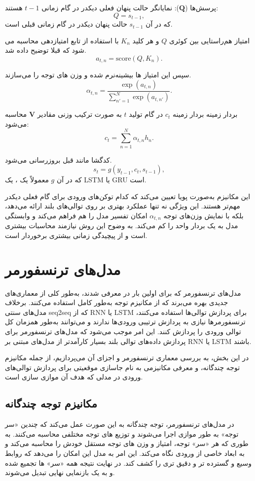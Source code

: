 پرسش‌ها ($\mathbf{Q}$):
نمایانگر حالت پنهان فعلی دیکدر در گام زمانی  $t-1 $ هستند:  
$$
Q = s_{t-1},
$$
که در آن \( s_{t-1} \) حالت پنهان دیکدر در گام زمانی قبلی است.

امتیاز هم‌راستایی بین کوئری $Q$ و هر کلید $ K_n $  با استفاده از تابع امتیازدهی محاسبه می شود که قبلا توضیح داده شد.
$$
a_{t, n} = \text{score}(Q, K_n).
$$

سپس این امتیاز ها بیشینه‌نرم شده و وزن های توجه را می‌سازند.
$$
\alpha_{t, n} = \frac{\exp(a_{t, n})}{\sum_{n'=1}^N \exp(a_{t, n'})}.
$$

بردار زمینه  
بردار زمینه $ c_t $ در گام تولید $t$ به صورت ترکیب وزنی مقادیر $\mathbf{V}$
محاسبه می‌شود:  
$$
c_t = \sum_{n=1}^N \alpha_{t, n} h_n.
$$


 کدگشا مانند قبل بروزرسانی می‌شود.  
$$
s_t = g(y_{t-1}, c_t, s_{t-1}),
$$
که در آن $g$ معمولاً یک ، یک
LSTM
 یا GRU است.

این مکانیزم به‌صورت پویا تعیین می‌کند که کدام توکن‌های ورودی برای گام فعلی دیکدر مهم‌تر هستند. این ویژگی نه تنها عملکرد بهتری بر روی توالی‌های بلند ارائه می‌دهد، بلکه با نمایش وزن‌های توجه $\alpha_{t,n}$ امکان تفسیر مدل را هم فراهم می‌کند و وابستگی مدل به یک بردار واحد را کم می‌کند. به وضوح این روش نیازمند محاسبات بیشتری است و از پیچیدگی زمانی بیشتری برخوردار است.

\section{مدل‌های ترنسفورمر}

مدل‌های ترنسفورمر که برای اولین بار در \cite{vaswaniAttentionAllYou2023} معرفی شدند، به‌طور کلی از معماری‌های جدیدی بهره می‌برند که از مکانیزم توجه به‌طور کامل استفاده می‌کنند. برخلاف مدل‌های سنتی seq2seq که از RNN یا LSTM برای پردازش توالی‌ها استفاده می‌کنند، ترنسفورمرها نیازی به پردازش ترتیبی ورودی‌ها ندارند و می‌توانند به‌طور همزمان کل توالی ورودی را پردازش کنند. این امر موجب می‌شود که مدل‌های ترنسفورمر برای پردازش داده‌های توالی بلند بسیار کارآمدتر از مدل‌های مبتنی بر RNN یا LSTM باشند.

در این بخش، به بررسی معماری ترنسفورمر و اجزای آن می‌پردازیم، از جمله مکانیزم توجه چندگانه، و معرفی مکانیزمی به نام جاسازی موقعیتی%
برای پردازش توالی‌های ورودی در مدلی که هدف آن موازی سازی است.
\subsection{مکانیزم توجه چندگانه \protect{}}
در مدل‌های ترنسفورمر، توجه چندگانه به این صورت عمل می‌کند که چندین «سر توجه»%
به طور موازی اجرا می‌شوند و توزیع های توجه مختلفی محاسبه می‌کنند. به طوری که هر «سر» توجه، امتیاز و وزن های توجه مستقل خودش را محاسبه می‌کند و به ابعاد خاصی از ورودی نگاه می‌کند. این امر به مدل این امکان را می‌دهد که روابط وسیع و گسترده تر و دقیق تری را کشف کند. در نهایت نتیجه همه «سر» ها تجمیع شده و به یک بازنمایی نهایی تبدیل می‌شوند.

